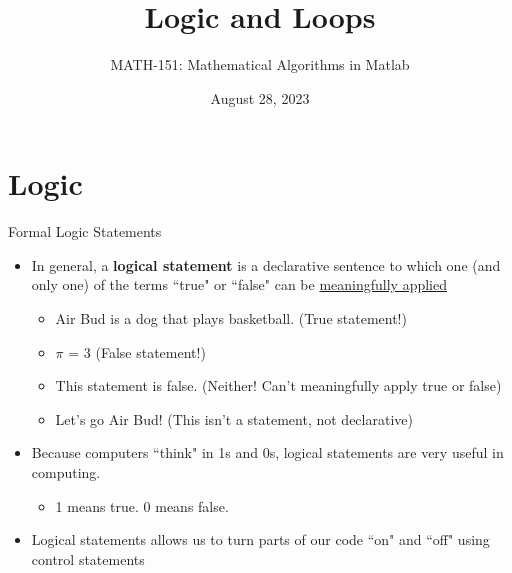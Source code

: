 {}\documentclass[letterpaper,
compress,
xcolor=x11names,
]{beamer}
\begin{document}
	\title{Logic and Loops}
	\author{MATH-151:  Mathematical Algorithms in Matlab}
	\date[202X]{August 28, 2023}




\begin{frame}
\titlepage
\end{frame}
\section{Logic}

\begin{frame}{Formal Logic Statements}
	\footnotesize
	\begin{itemize}
		\item In general, a \textbf{logical statement} is a declarative sentence to which one (and only one) of the terms ``true" or ``false" can be \underline{meaningfully applied}
		\begin{itemize}
			\item Air Bud is a dog that plays basketball. (True statement!)
			\item $\pi$ = 3 (False statement!)
			\item This statement is false. (Neither! Can't meaningfully apply true or false)
			\item Let's go Air Bud! (This isn't a statement, not declarative) 
		\end{itemize}
		\item<2-> Because computers ``think" in 1s and 0s, logical statements are very useful in computing.
		\begin{itemize}
			\item 1 means true. 0 means false.
		\end{itemize}
		\item<2-> Logical statements allows us to turn parts of our code ``on" and ``off" using control statements
	\end{itemize}
	\begin{center}
	\end{center}
\end{frame}
\end{document}
